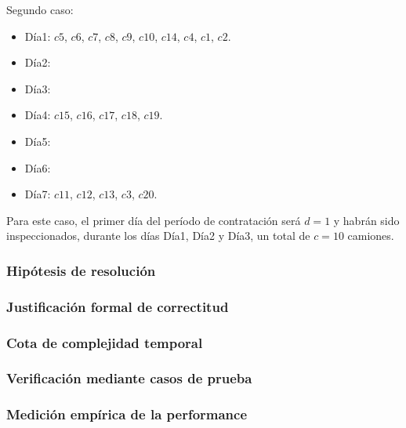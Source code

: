 \documentclass[11pt, a4paper, twoside]{article}
\begin{document}
Segundo caso:

\begin{itemize}
\item D\'ia1: $c5$, $c6$, $c7$, $c8$, $c9$, $c10$, $c14$, $c4$, $c1$, $c2$. 
\item D\'ia2:  
\item D\'ia3: 
\item D\'ia4: $c15$, $c16$, $c17$, $c18$, $c19$. 
\item D\'ia5: 
\item D\'ia6: 
\item D\'ia7: $c11$, $c12$, $c13$, $c3$, $c20$.
\end{itemize}  

Para este caso, el primer d\'ia del per\'iodo de contrataci\'on ser\'a $d=1$ y habr\'an sido inspeccionados, durante los d\'ias D\'ia1, D\'ia2 y D\'ia3, un total de $c=10$ camiones. 

\subsubsection{Hipótesis de resolución}

\subsubsection{Justificación formal de correctitud}

\subsubsection{Cota de complejidad temporal}

\subsubsection{Verificación mediante casos de prueba}

\subsubsection{Medición empírica de la performance}

\end{document}
